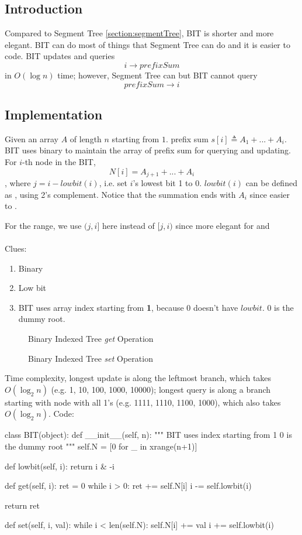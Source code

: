 \subsection{Introduction}
Compared to Segment Tree \ref{section:segmentTree}, BIT is shorter and more elegant. BIT can do most of things that Segment Tree can do and it is easier to code. BIT updates and queries $$i\rightarrow prefixSum$$ in $O(\log n)$ time; however, Segment Tree can but BIT cannot query $$prefixSum \rightarrow i$$
\subsection{Implementation}
Given an array $A$ of length $n $ starting from $1$. prefix sum $s[i]\triangleq A_1+...+A_i$. BIT uses binary to maintain the array of prefix sum for querying and updating. For $i$-th node in the BIT, 
$$
N[i]=A_{j+1}+...+A_i
$$
, where $j=i-lowbit(i)$, i.e. set $i$'s lowest bit 1 to 0. $lowbit(i)$ can be defined as , using 2's complement. Notice that the summation ends with $A_i$ since easier to .

For the range, we use $(j, i]$ here instead of $[j, i)$ since more elegant for  and 
\\\\
Clues:
\begin{enumerate}
\item Binary 
\item Low bit
\item BIT uses array index starting from \textbf{1}, because 0 doesn't have $lowbit$. 0 is the dummy root.
\end{enumerate}
\begin{figure}[hbtp]
\centering
{}
\caption{Binary Indexed Tree \textit{get} Operation}
\label{fig:LABEL}
\end{figure}

\begin{figure}[hbtp]
\centering
{}
\caption{Binary Indexed Tree \textit{set} Operation}
\label{fig:LABEL}
\end{figure}

Time complexity, longest update is along the leftmost branch, which takes $O(\log_2 n)$ (e.g. 1, 10, 100, 1000, 10000); longest query is along a branch starting with node with all 1's (e.g. 1111, 1110, 1100, 1000), which also takes $O(\log_2 n)$.
\newpage
Code:
\begin{python}
class BIT(object):
    def __init__(self, n):
        """
        BIT uses index starting from 1
        0 is the dummy root 
        """
        self.N = [0 for _ in xrange(n+1)]

    def lowbit(self, i):
        return i & -i

    def get(self, i):
        ret = 0
        while i > 0:
            ret += self.N[i]
            i -= self.lowbit(i)

        return ret
        
    def set(self, i, val):
        while i < len(self.N):
            self.N[i] += val
            i += self.lowbit(i)
\end{python}


